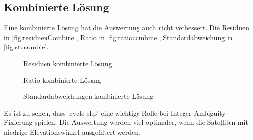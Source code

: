 \subsection{Kombinierte Lösung}
Eine kombinierte Lösung hat die Auswertung auch nicht verbessert. Die Residuen in \autoref{fig:residuenCombine}, Ratio in \autoref{fig:ratiocombine}, Standardabweichung in \autoref{fig:stdcombie}.
\begin{figure}[ht]\centering  
	\caption{Residuen kombinierte Lösung}
	\label{fig:residuenCombine}
\end{figure}
\begin{figure}[ht]\centering 
	\caption{Ratio kombinierte Lösung}
	\label{fig:ratiocombine}
\end{figure}
\clearpage
\begin{figure}[ht]\centering 
	\caption{Standardabweichungen kombinierte Lösung}
	\label{fig:stdcombie}
\end{figure}
Es ist zu sehen, dass 'cycle slip' eine wichtige Rolle bei Integer Ambiguity Fixierung spielen. Die Auswertung werden viel optimaler, wenn die Satelliten mit niedrige Elevationswinkel ausgefiltert werden. \clearpage
